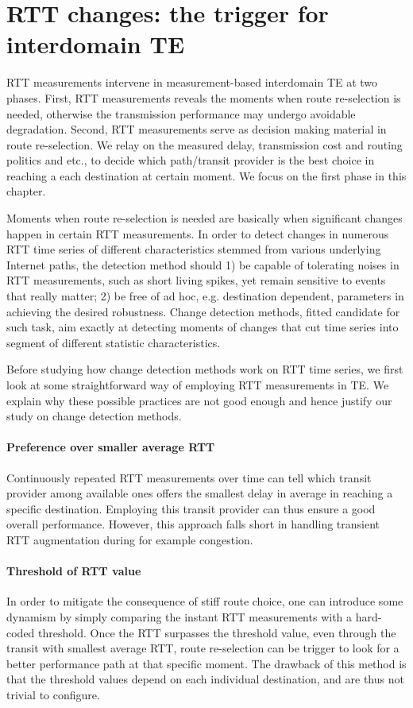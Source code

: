 \section{RTT changes: the trigger for interdomain TE}
RTT measurements intervene in measurement-based interdomain TE at two phases. 
First, RTT measurements reveals the moments when route re-selection is needed, otherwise the transmission performance may undergo avoidable degradation.  
Second, RTT measurements serve as decision making material in route re-selection. We relay on the measured delay, transmission cost and routing politics and etc., to decide which path/transit provider is the best choice  in reaching a each destination at certain moment. 
We focus on the first phase in this chapter.

Moments when route re-selection is needed are basically when significant changes happen in certain RTT measurements. In order to detect changes in numerous RTT time series of different characteristics stemmed from various underlying Internet paths, the detection method should 1) be capable of tolerating noises in RTT measurements, such as short living spikes, yet remain sensitive to events that really matter; 2) be free of ad hoc, e.g. destination dependent, parameters in achieving the desired robustness. 
Change detection methods, fitted candidate for such task, aim exactly at detecting moments of changes that cut time series into segment of different statistic characteristics.

Before studying how change detection methods work on RTT time series, we first look at some straightforward way of employing RTT measurements in TE. We explain why these possible practices are not good enough and hence justify our study on change detection methods.

\paragraph{Preference over smaller average RTT} Continuously repeated RTT measurements over time can tell which transit provider among available ones offers the smallest delay in average in reaching a specific destination. Employing this transit provider can thus ensure a good overall performance. However, this approach falls short in handling transient RTT augmentation during for example congestion.

\paragraph{Threshold of RTT value} In order to mitigate the consequence of stiff route choice, one can introduce some dynamism by simply comparing the instant RTT measurements with a hard-coded threshold. Once the RTT surpasses the threshold value, even through the transit with smallest average RTT, route re-selection can be trigger to look for a better performance path at that specific moment.
The drawback of this method is that the threshold values depend on each individual destination, and are thus not trivial to configure.

